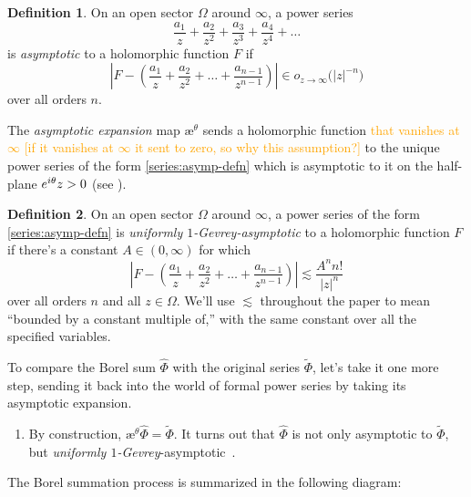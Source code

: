 \documentclass{article}
\let\Re\relax
\DeclareMathOperator{\Re}{Re}
\theoremstyle{definition}
\newtheorem{defn}{Definition}
\newcommand{\series}[1]{\tilde{#1}}
\newcommand{\laplace}{\mathcal{L}}
\newcommand{\borel}{\mathcal{B}}
\newcommand{\aexp}{\text{\ae}}
\begin{document}
\begin{defn}
On an open sector $\Omega$ around $\infty$, a power series
\begin{equation}\label{series:asymp-defn}
\frac{a_1}{z} + \frac{a_2}{z^2} + \frac{a_3}{z^3} + \frac{a_4}{z^4} + \ldots
\end{equation}
is {\em asymptotic} to a holomorphic function $F$ if
\[ \left|F - \left(\frac{a_1}{z} + \frac{a_2}{z^2} + \ldots + \frac{a_{n-1}}{z^{n-1}} \right) \right| \in o_{z \to \infty}\big(|z|^{-n}\big) \]
over all orders $n$.

The {\em asymptotic expansion} map $\aexp^\theta$ sends a holomorphic function \textcolor{orange}{that vanishes at $\infty$ [if it vanishes at $\infty$ it sent to zero, so why this assumption?]} to the unique power series of the form \eqref{series:asymp-defn} which is asymptotic to it on the half-plane $\Re e^{i\theta}z > 0$ (see \cite[Theorem~C.11]{nikolaev2023existence}).
\end{defn}
\begin{defn}\label{def:unif-gevrey-asymp}
On an open sector $\Omega$ around $\infty$, a power series of the form \eqref{series:asymp-defn} is {\em uniformly $1$-Gevrey-asymptotic} to a holomorphic function $F$ if there's a constant $A \in (0, \infty)$ for which
\[ \left|F - \left(\frac{a_1}{z} + \frac{a_2}{z^2} + \ldots + \frac{a_{n-1}}{z^{n-1}} \right) \right| \lesssim \frac{A^n n!}{|z|^n} \]
over all orders $n$ and all $z \in \Omega$. We'll use $\lesssim$ throughout the paper to mean ``bounded by a constant multiple of,'' with the same constant over all the specified variables.
\end{defn}
To compare the Borel sum $\hat{\Phi}$ with the original series $\series{\Phi}$, let's take it one more step, sending it back into the world of formal power series by taking its asymptotic expansion.

\begin{enumerate}[start=4]
\item By construction, $\aexp^\theta \hat{\Phi} = \series{\Phi}$. It turns out that $\hat{\Phi}$ is not only asymptotic to $\series{\Phi}$, but {\em {uniformly} $1$-Gevrey}-asymptotic~\cite[Corollary~5.23]{diverg-resurg-i}.
\end{enumerate}

The Borel summation process is summarized in the following diagram:
\begin{center}
\end{center}
\end{document}
